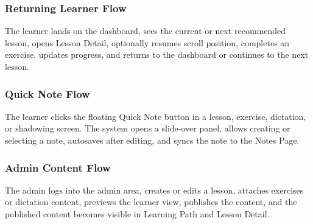 
\subsubsection{Returning Learner Flow}

The learner lands on the dashboard, sees the current or next recommended lesson, opens Lesson Detail, optionally resumes scroll position, completes an exercise, updates progress, and returns to the dashboard or continues to the next lesson.


\subsubsection{Quick Note Flow}

The learner clicks the floating Quick Note button in a lesson, exercise, dictation, or shadowing screen. The system opens a slide-over panel, allows creating or selecting a note, autosaves after editing, and syncs the note to the Notes Page.


\subsubsection{Admin Content Flow}

The admin logs into the admin area, creates or edits a lesson, attaches exercises or dictation content, previews the learner view, publishes the content, and the published content becomes visible in Learning Path and Lesson Detail.


